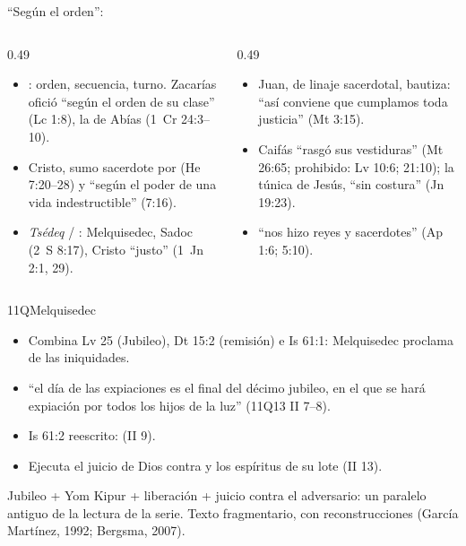 \begin{frame}{``Según el orden'': }
\begin{columns}[t,onlytextwidth]
\begin{column}{0.49\textwidth}\scriptsize
\begin{itemize}
\item {}: orden, secuencia, turno. Zacarías ofició ``según el orden de su clase'' (Lc 1:8), la de Abías (1~Cr 24:3--10).
\item Cristo, sumo sacerdote por  (He 7:20--28) y ``según el poder de una vida indestructible'' (7:16).
\item \emph{Tsédeq} / : Melquisedec, Sadoc (2~S 8:17), Cristo ``justo'' (1~Jn 2:1, 29).
\end{itemize}
\end{column}
\begin{column}{0.49\textwidth}\scriptsize
{}
\begin{itemize}
\item Juan, de linaje sacerdotal, bautiza: ``así conviene que cumplamos toda justicia'' (Mt 3:15).
\item Caifás ``rasgó sus vestiduras'' (Mt 26:65; prohibido: Lv 10:6; 21:10); la túnica de Jesús, ``sin costura'' (Jn 19:23).
\item ``nos hizo reyes y sacerdotes'' (Ap 1:6; 5:10).
\end{itemize}
\end{column}
\end{columns}
\end{frame}

\begin{frame}{11QMelquisedec}
\scriptsize
\begin{itemize}
\item Combina Lv 25 (Jubileo), Dt 15:2 (remisión) e Is 61:1: Melquisedec proclama  de las iniquidades.
\item ``el día de las expiaciones es el final del décimo jubileo, en el que se hará expiación por todos los hijos de la luz'' (11Q13 II 7--8).
\item Is 61:2 reescrito:  (II 9).
\item Ejecuta el juicio de Dios contra  y los espíritus de su lote (II 13).
\end{itemize}
\begin{tcolorbox}[colback=mostaza!12,colframe=mostaza!80!tierraroja,boxrule=0.6pt,arc=2pt,fontupper=\scriptsize]
Jubileo + Yom Kipur + liberación + juicio contra el adversario: un paralelo antiguo de la lectura de la serie. Texto fragmentario, con reconstrucciones (García Martínez, 1992; Bergsma, 2007).
\end{tcolorbox}
\end{frame}

